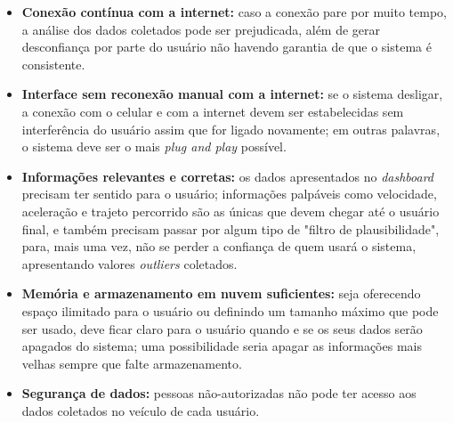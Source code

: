 \begin{itemize}
    \item \textbf{Conexão contínua com a internet:} caso a conexão pare por muito tempo, a análise dos dados coletados pode ser prejudicada, além de gerar desconfiança por parte do usuário não havendo garantia de que o sistema é consistente.
    
    \item \textbf{Interface sem reconexão manual com a internet:} se o sistema desligar, a conexão com o celular e com a internet devem ser estabelecidas sem interferência do usuário assim que for ligado novamente; em outras palavras, o sistema deve ser o mais \textit{plug and play} possível.
    
    \item \textbf{Informações relevantes e corretas:} os dados apresentados no \textit{dashboard} precisam ter sentido para o usuário; informações palpáveis como velocidade, aceleração e trajeto percorrido são as únicas que devem chegar até o usuário final, e também precisam passar por algum tipo de "filtro de plausibilidade", para, mais uma vez, não se perder a confiança de quem usará o sistema, apresentando valores \textit{outliers} coletados. 
    
    \item \textbf{Memória e armazenamento em nuvem suficientes:} seja oferecendo espaço ilimitado para o usuário ou definindo um tamanho máximo que pode ser usado, deve ficar claro para o usuário quando e se os seus dados serão apagados do sistema; uma possibilidade seria apagar as informações mais velhas sempre que falte armazenamento.
    
    \item \textbf{Segurança de dados:} pessoas não-autorizadas não pode ter acesso aos dados coletados no veículo de cada usuário.
\end{itemize}



